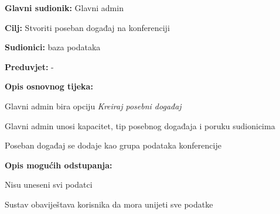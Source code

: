     \noindent {}
			\begin{packed_item}
				
				\item \textbf{Glavni sudionik:} Glavni admin
				\item  \textbf{Cilj:} Stvoriti poseban događaj na konferenciji
				\item  \textbf{Sudionici:} baza podataka
				\item  \textbf{Preduvjet:} -
				\item  \textbf{Opis osnovnog tijeka:}
				
				\item[] \begin{packed_enum}
					
					\item Glavni admin bira opciju \textit{Kreiraj posebni događaj}
					\item Glavni admin unosi kapacitet, tip posebnog događaja i poruku sudionicima
					\item Poseban događaj se dodaje kao grupa podataka konferencije
				\end{packed_enum}
         \item  \textbf{Opis mogućih odstupanja:}
					
					\item[] \begin{packed_item}
						
						\item[1.] Nisu uneseni svi podatci
						\item[] \begin{packed_enum}

                                \item Sustav obaviještava korisnika da mora unijeti sve podatke
							
						\end{packed_enum}
						
					\end{packed_item}
			\end{packed_item}



